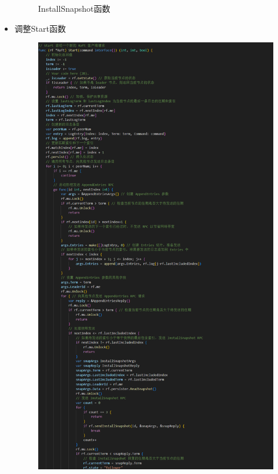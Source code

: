\documentclass[]{article}
\begin{document}
\begin{itemize}
\begin{figure}[H]
			\caption{InstallSnapshot函数}
		\end{figure}
		\item 调整Start函数
		\begin{figure}[H]
			\centering
			\includegraphics[height=1\textheight]{./2D/Start1.png}
		\end{figure}
		\begin{figure}[H]
			\centering

\end{figure}
\end{itemize}
\end{document}
